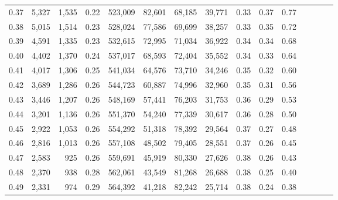 \begin{tabular}{rrrcrrrrrrrrrrr}
0.37 &   5,327 &  1,535 &                                       0.22 &  523,009 &   82,601 &   68,185 &   39,771 &  0.33 &  0.37 &                         0.77 \\
0.38 &   5,015 &  1,514 &                                       0.23 &  528,024 &   77,586 &   69,699 &   38,257 &  0.33 &  0.35 &                         0.72 \\
0.39 &   4,591 &  1,335 &                                       0.23 &  532,615 &   72,995 &   71,034 &   36,922 &  0.34 &  0.34 &                         0.68 \\
0.40 &   4,402 &  1,370 &                                       0.24 &  537,017 &   68,593 &   72,404 &   35,552 &  0.34 &  0.33 &                         0.64 \\
0.41 &   4,017 &  1,306 &                                       0.25 &  541,034 &   64,576 &   73,710 &   34,246 &  0.35 &  0.32 &                         0.60 \\
0.42 &   3,689 &  1,286 &                                       0.26 &  544,723 &   60,887 &   74,996 &   32,960 &  0.35 &  0.31 &                         0.56 \\
0.43 &   3,446 &  1,207 &                                       0.26 &  548,169 &   57,441 &   76,203 &   31,753 &  0.36 &  0.29 &                         0.53 \\
0.44 &   3,201 &  1,136 &                                       0.26 &  551,370 &   54,240 &   77,339 &   30,617 &  0.36 &  0.28 &                         0.50 \\
0.45 &   2,922 &  1,053 &                                       0.26 &  554,292 &   51,318 &   78,392 &   29,564 &  0.37 &  0.27 &                         0.48 \\
0.46 &   2,816 &  1,013 &                                       0.26 &  557,108 &   48,502 &   79,405 &   28,551 &  0.37 &  0.26 &                         0.45 \\
0.47 &   2,583 &    925 &                                       0.26 &  559,691 &   45,919 &   80,330 &   27,626 &  0.38 &  0.26 &                         0.43 \\
0.48 &   2,370 &    938 &                                       0.28 &  562,061 &   43,549 &   81,268 &   26,688 &  0.38 &  0.25 &                         0.40 \\
0.49 &   2,331 &    974 &                                       0.29 &  564,392 &   41,218 &   82,242 &   25,714 &  0.38 &  0.24 &                         0.38 \\

\end{tabular}
